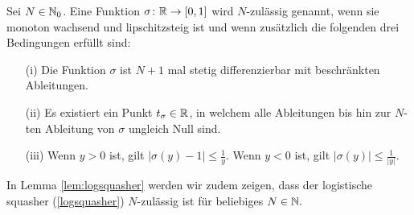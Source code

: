 \begin{defn}
\label{nzulässig}
Sei $N \in \mathbb{N}_0$. Eine Funktion $\sigma\colon \mathbb{R} \to [0, 1]$ wird $N$-zulässig genannt, wenn sie monoton wachsend und lipschitzsteig \cite{forster2016} ist und wenn zusätzlich die folgenden drei Bedingungen erfüllt sind$\colon$
\begin{itemize}
\item[(i)] Die Funktion $\sigma$ ist $N + 1$ mal stetig differenzierbar mit beschränkten Ableitungen.
\item[(ii)] Es existiert ein Punkt $t_{\sigma} \in \mathbb{R}$, in welchem alle Ableitungen bis hin zur $N$-ten Ableitung von $\sigma$ ungleich Null sind.
\item[(iii)] Wenn $y > 0$ ist, gilt $|\sigma(y) - 1| \leq \frac{1}{y}$. Wenn $y < 0$ ist, gilt $|\sigma(y)| \leq \frac{1}{|y|}$.
\end{itemize}  
\end{defn}  

In Lemma \ref{lem:logsquasher} werden wir zudem zeigen, dass der logistische squasher (\ref{logsquasher}) $N$-zulässig ist für beliebiges $N \in \mathbb{N}.$ 

